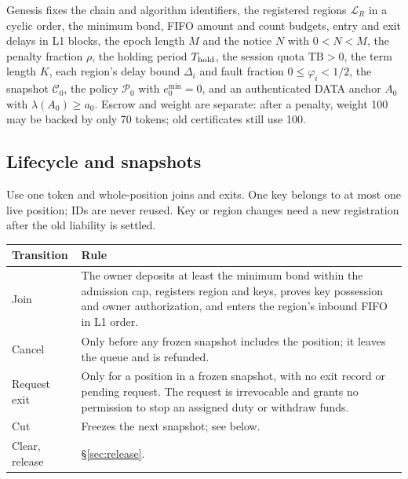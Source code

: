 \documentclass[11pt,a4paper]{article}
\newcommand{\cfg}{\mathcal C}
\newcommand{\emin}{e^{\min}}
\begin{document}
Genesis fixes the chain and algorithm identifiers, the registered regions
$\mathcal L_R$ in a cyclic order, the minimum bond, FIFO amount and count
budgets, entry and exit delays in L1 blocks, the epoch length $M$ and
the notice $N$ with $0<N<M$, the penalty fraction $\rho$, the holding
period $T_{\rm hold}$, the session quota $\mathrm{TB}>0$, the term length
$K$, each region's delay bound $\Delta_i$ and fault fraction
$0\le\varphi_i<1/2$, the snapshot $\cfg_0$, the policy $\mathcal P_0$ with
$\emin_0=0$, and an authenticated DATA anchor $A_0$ with
$\lambda(A_0)\ge a_0$. Escrow and weight are separate: after a penalty,
weight 100 may be backed by only 70 tokens; old certificates still use
100.

\subsection{Lifecycle and snapshots}
\label{sec:lifecycle}
Use one token and whole-position joins and exits. One key belongs to at
most one live position; IDs are never reused. Key or region changes need
a new registration after the old liability is settled.

\begin{center}
\end{center}

\begin{tabularx}{\linewidth}{@{}>{\raggedright\arraybackslash}p{.15\linewidth}Y@{}}\toprule
Transition & Rule\\\midrule
Join & The owner deposits at least the minimum bond within the admission
cap, registers region and keys, proves key possession and owner
authorization, and enters the region's inbound FIFO in L1 order.\\
Cancel & Only before any frozen snapshot includes the position; it
leaves the queue and is refunded.\\
Request exit & Only for a position in a frozen snapshot, with no exit
record or pending request. The request is irrevocable and grants no
permission to stop an assigned duty or withdraw funds.\\
Cut & Freezes the next snapshot; see below.\\
Clear, release & \S\ref{sec:release}.\\\bottomrule
\end{tabularx}
\end{document}
